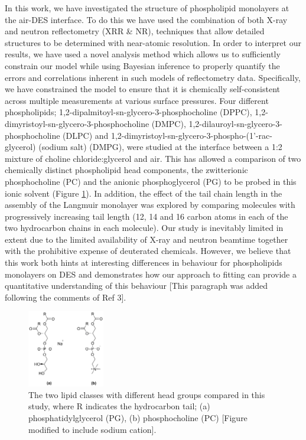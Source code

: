 \documentclass[amsmath,amssymb,twocolumn,superscriptaddress]{revtex4-1}
\begin{document}
In this work, we have investigated the structure of phospholipid monolayers at the air-DES interface.
To do this we have used the combination of both X-ray and neutron reflectometry (XRR \& NR), techniques that allow detailed structures to be determined with near-atomic resolution.
In order to interpret our results, we have used a novel analysis method which allows us to sufficiently constrain our model while using Bayesian inference \cite{abeles_sur_1948, parratt_surface_1954} to properly quantify the errors and correlations inherent in such models of reflectometry data.
Specifically, we have constrained the model to ensure that it is chemically self-consistent across multiple measurements at various surface pressures.
Four different phospholipids; 1,2-dipalmitoyl-sn-glycero-3-phosphocholine (DPPC), 1,2-dimyristoyl-sn-glycero-3-phosphocholine (DMPC),  1,2-dilauroyl-sn-glycero-3-phosphocholine (DLPC) and 1,2-dimyristoyl-sn-glycero-3-phospho-(1'-rac-glycerol) (sodium salt) (DMPG), were studied at the interface between a 1:2 mixture of choline chloride:glycerol and air.
This has allowed a comparison of two chemically distinct phospholipid head components, the zwitterionic phosphocholine (PC) and the anionic phosphoglycerol (PG) to be probed in this ionic solvent (Figure \ref{fig:heads}).
In addition, the effect of the tail chain length in the assembly of the Langmuir monolayer was explored by comparing molecules with progressively increasing tail length (12, 14 and 16 carbon atoms in each of the two hydrocarbon chains in each molecule).
Our study is inevitably limited in extent due to the limited availability of X-ray and neutron beamtime together with the prohibitive expense of deuterated chemicals. However, we believe that this work both hints at interesting differences in behaviour for phospholipids monolayers on DES and demonstrates how our approach to fitting can provide a quantitative understanding of this behaviour [This paragraph was added following the comments of Ref 3].
%
\begin{figure}
\includegraphics[width=0.3\textwidth]{figures/head_groups}
\caption{\label{fig:heads}\small The two lipid classes with different head
groups compared in this study, where R indicates the hydrocarbon tail;
(a) phosphatidylglycerol (PG), (b) phosphocholine (PC) [Figure modified to include sodium cation].}
\end{figure}
%
\end{document}
